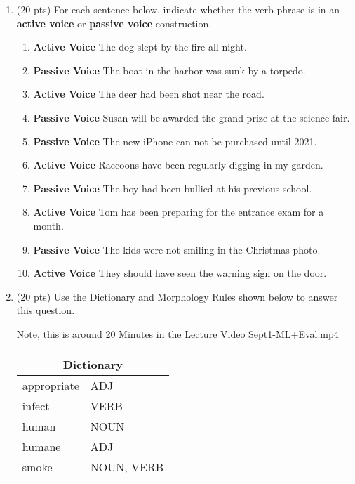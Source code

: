 \documentclass[11pt]{article}
\begin{document}
\begin{enumerate}
\item (20 pts) For each sentence below, indicate whether the verb
  phrase is in an {\bf active voice} or {\bf passive voice}
  construction.  

\begin{enumerate}

\item \textbf{Active Voice} The dog slept by the fire all night.

\item \textbf{Passive Voice} The boat in the harbor was sunk by a torpedo.

\item \textbf{Active Voice} The deer had been shot near the road.

\item \textbf{Passive Voice} Susan will be awarded the grand prize at the science fair.

\item \textbf{Passive Voice} The new iPhone can not be purchased until 2021.

\item \textbf{Active Voice} Raccoons have been regularly digging in my garden. 

\item \textbf{Passive Voice} The boy had been bullied at his previous school.
 
\item \textbf{Active Voice} Tom has been preparing for the entrance exam for a month.

\item \textbf{Passive Voice} The kids were not smiling in the Christmas photo.

\item \textbf{Active Voice} They should have seen the warning sign on the door.


\end{enumerate}


\newpage

\item (20 pts) Use the Dictionary and Morphology Rules shown below to
  answer this question. 

Note, this is around 20 Minutes in the Lecture Video Sept1-ML+Eval.mp4

\begin{center}
\begin{tabular}{|ll|} \hline
\multicolumn{2}{|c|}{\bf Dictionary} \\ \hline
appropriate & ADJ \\
infect & VERB \\
human & NOUN \\
humane & ADJ \\
smoke & NOUN, VERB  \\  \hline
\end{tabular}
\end{center}


\end{enumerate}
\end{document}
